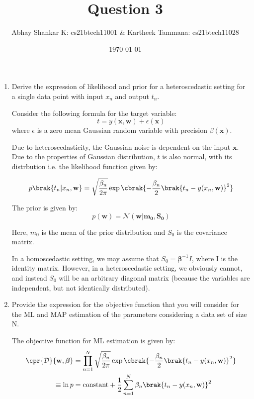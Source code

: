 \documentclass{amsart}
\begin{document}
    \title{Question 3}
    \author{Abhay Shankar K: cs21btech11001 \& Kartheek Tammana: cs21btech11028}
    \date{\today}
    \maketitle

    \begin{enumerate}[label=\textbf{(\Roman*)}]
        \item Derive the expression of likelihood and prior for a heteroscedastic setting for a single data point with input \(x_n\) and output \(t_n\).
        
        Consider the following formula for the target variable:
        \[t = y(\mathbf{x, w}) + \epsilon(\mathbf{x})\] where \(\epsilon\) is a zero mean Gaussian random variable with precision \(\beta(\mathbf{x})\). 
        
        Due to heteroscedasticity, the Gaussian noise is dependent on the input \(\mathbf{x}\). Due to the properties of Gaussian distribution, \(t\) is also normal, with its distrbution i.e. the likelihood function given by:

        \[p\brak{t_n | x_n, \mathbf{w}} = \sqrt{\frac{\beta_n}{2\pi}} \exp \cbrak{- \frac{\beta_n}{2} \brak{t_n - y(x_n, \mathbf{w})}^2}\]


        The prior is given by:
        \[p(\mathbf{w}) = \mathcal{N}(\mathbf{w} | \mathbf{m_0}, \mathbf{S_0})\]

        Here, \(m_0\) is the mean of the prior distribution and \(S_0\) is the covariance matrix.

        In a homoscedastic setting, we may assume that \(S_0 = \mathbf{\beta}^{-1} I\), where I is the identity matrix. However, in a heteroscedastic setting, we obviously cannot, and instead \(S_0\) will be an arbitrary diagonal matrix (because the variables are independent, but not identically distributed).

        \item Provide the expression for the objective function that you will consider for the ML and MAP estimation of the parameters considering a data set of size N.
        
        The objective function for ML estimation is given by:
        \begin{align}
            \cpr{\mathcal{D}}{\mathbf{w}, \boldsymbol{\beta}} &= \prod_{n = 1}^{N} \sqrt{\frac{\beta_n}{2\pi}} \exp \cbrak{- \frac{\beta_n}{2} \brak{t_n - y(x_n, \mathbf{w})}^2} \\
            \equiv \ln p &= \text{constant} + \frac{1}{2} \sum_{n = 1}^{N} \beta_n \brak{t_n - y(x_n, \mathbf{w})}^2 \label{eq:ml}
        \end{align}


\end{enumerate}
\end{document}
